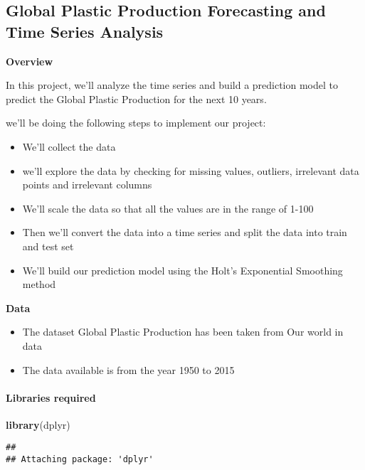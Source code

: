 \documentclass[
]{article}
\author{}
\date{\vspace{-2.5em}}
\newenvironment{Shaded}{\begin{snugshade}}{\end{snugshade}}
\newcommand{\KeywordTok}[1]{\textcolor[rgb]{0.13,0.29,0.53}{\textbf{#1}}}
\newcommand{\NormalTok}[1]{#1}
\providecommand{\tightlist}{%
  \setlength{\itemsep}{0pt}\setlength{\parskip}{0pt}}
\begin{document}
\hypertarget{global-plastic-production-forecasting-and-time-series-analysis}{%
\subsection{Global Plastic Production Forecasting and Time Series
Analysis}\label{global-plastic-production-forecasting-and-time-series-analysis}}

\textbf{Overview}

In this project, we'll analyze the time series and build a prediction
model to predict the Global Plastic Production for the next 10 years.

we'll be doing the following steps to implement our project:

\begin{itemize}
\tightlist
\item
  We'll collect the data
\item
  we'll explore the data by checking for missing values, outliers,
  irrelevant data points and irrelevant columns
\item
  We'll scale the data so that all the values are in the range of 1-100
\item
  Then we'll convert the data into a time series and split the data into
  train and test set
\item
  We'll build our prediction model using the Holt's Exponential
  Smoothing method
\end{itemize}

\textbf{Data}

\begin{itemize}
\tightlist
\item
  The dataset Global Plastic Production has been taken from Our world in
  data
\item
  The data available is from the year 1950 to 2015
\end{itemize}

\hypertarget{libraries-required}{%
\paragraph{Libraries required}\label{libraries-required}}

\begin{Shaded}
\begin{Highlighting}[]
\KeywordTok{library}\NormalTok{(dplyr)}
\end{Highlighting}
\end{Shaded}

\begin{verbatim}
## 
## Attaching package: 'dplyr'
\end{verbatim}
\end{document}

